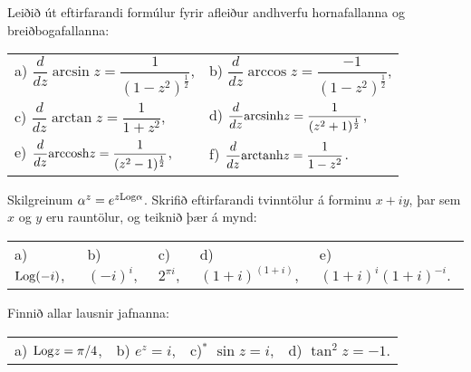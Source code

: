 \daemi Leiðið út eftirfarandi formúlur fyrir afleiður andhverfu
hornafallanna og  breiðbogafallanna:

\smallskip
\begin{tabular}{ll}
a) $\dfrac d{dz}\arcsin z= \dfrac 1{(1-z^2)^{\frac 12}}$,
&b) $\dfrac d{dz} \arccos z= \dfrac {-1}{(1-z^2)^{\frac 12}}$,\\
c) $\dfrac d{dz} \arctan z= \dfrac 1{1+z^2}$,
&d) $\dfrac d{dz}{\operatorname{arcsinh}} z= \dfrac 1{(z^2+1)^{\frac 12}}$,\\
e) $\dfrac d{dz} {\operatorname{arccosh}} z= \dfrac 1{(z^2-1)^{\frac 12}}$,
&f) $\dfrac d{dz} {\operatorname{arctanh}} z= \dfrac 1{1-z^2}$.\\ 
\end{tabular}


\daemi Skilgreinum
${\alpha}^z=e^{z{\operatorname{Log}}\alpha}$.  Skrifið eftirfarandi tvinntölur á forminu
$x+iy$, þar sem $x$ og $y$ eru rauntölur, og teiknið þær á mynd:

\begin{tabular}{lllll}
a) ${\operatorname{Log}}(-i)$,   
&b) $(-i)^i$,
&c) $2^{{\pi}i}$,
&d) $(1+i)^{(1+i)}$,
&e) $(1+i)^i(1+i)^{-i}$.\\
\end{tabular}


\daemi Finnið allar lausnir jafnanna:
\smallskip

\begin{tabular}{llll}
a) ${\operatorname{Log}} z={\pi}/4$,
&b) $e^z=i$,
&c)$^\ast$ $\sin z=i$,
&d) $\tan^2 z=-1$.\\
\end{tabular}


